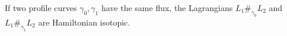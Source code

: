 
 
 
If two profile curves $\gamma_0, \gamma_1$ have the same flux, the Lagrangians $L_1\#_{\gamma_0} L_2$ and $L_1\#_{\gamma_1} L_2$ are Hamiltonian isotopic. 

 